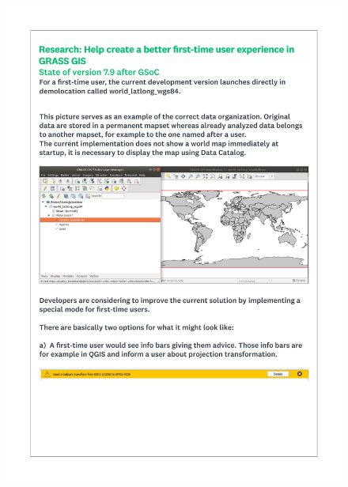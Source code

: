 \documentclass[a4paper,10pt,twoside]{article}
\begin{document}
 \newpage
 \begin{figure}[hbt!]
 \begin{center}
 \includegraphics[width=15.5cm]{../surveys/questionnaires/survey1_part2_page2_state_after_gsoc.pdf}
 \end{center}
 \end{figure}
 
\end{document}
